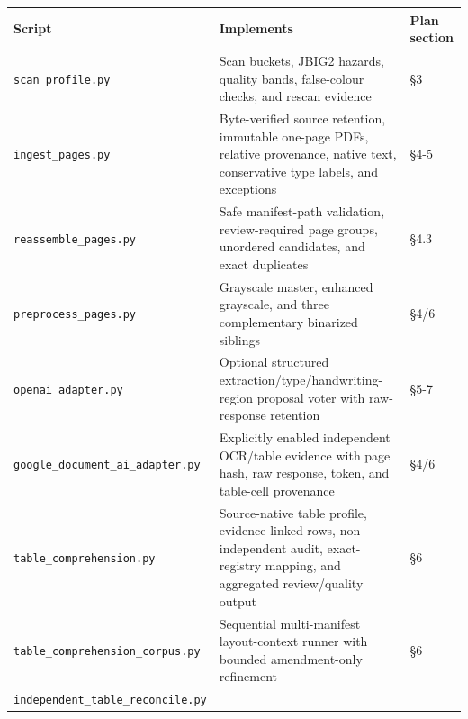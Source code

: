 \documentclass[
]{article}
\newcounter{none} %
\begin{document}
{\def\LTcaptype{none} %
\begin{longtable}[]{@{}
  >{\raggedright\arraybackslash}p{}
  >{\raggedright\arraybackslash}p{}
  >{\raggedright\arraybackslash}p{}@{}}
\toprule\noalign{}
\begin{minipage}[b]{\linewidth}\raggedright
Script
\end{minipage} & \begin{minipage}[b]{\linewidth}\raggedright
Implements
\end{minipage} & \begin{minipage}[b]{\linewidth}\raggedright
Plan section
\end{minipage} \\
\midrule\noalign{}
\endhead
\bottomrule\noalign{}
\endlastfoot
\texttt{scan\_\allowbreak{}profile.py} & Scan buckets, JBIG2 hazards,
quality bands, false-colour checks, and rescan evidence & §3 \\
\texttt{ingest\_\allowbreak{}pages.py} & Byte-verified source retention,
immutable one-page PDFs, relative provenance, native text, conservative
type labels, and exceptions & §4-5 \\
\texttt{reassemble\_\allowbreak{}pages.py} & Safe manifest-path
validation, review-required page groups, unordered candidates, and exact
duplicates & §4.3 \\
\texttt{preprocess\_\allowbreak{}pages.py} & Grayscale master, enhanced
grayscale, and three complementary binarized siblings & §4/6 \\
\texttt{openai\_\allowbreak{}adapter.py} & Optional structured
extraction/type/handwriting-region proposal voter with raw-response
retention & §5-7 \\
\texttt{google\_\allowbreak{}document\_\allowbreak{}ai\_\allowbreak{}adapter.py}
& Explicitly enabled independent OCR/table evidence with page hash, raw
response, token, and table-cell provenance & §4/6 \\
\texttt{table\_\allowbreak{}comprehension.py} & Source-native table
profile, evidence-linked rows, non-independent audit, exact-registry
mapping, and aggregated review/quality output & §6 \\
\texttt{table\_\allowbreak{}comprehension\_\allowbreak{}corpus.py} &
Sequential multi-manifest layout-context runner with bounded
amendment-only refinement & §6 \\
\texttt{independent\_\allowbreak{}table\_\allowbreak{}reconcile.py} &

\end{longtable}}
\end{document}
